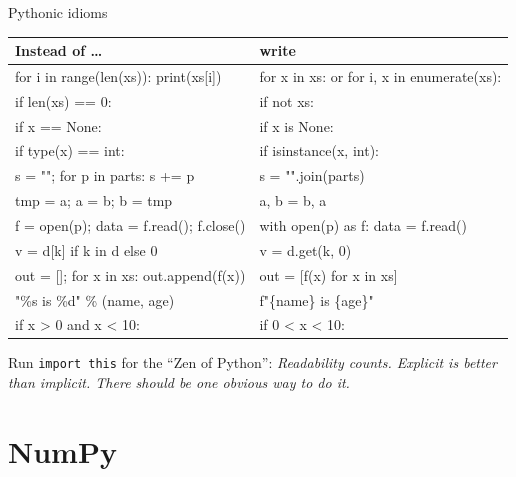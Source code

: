 \documentclass[aspectratio=169,9pt]{beamer}
\newcommand{\hint}[1]{{\small\color{ink2}#1}}  %
\newcommand{\gr}[1]{\textsf{\color{ink2}#1}}                %
\begin{document}
\begin{frame}{Pythonic idioms}
\small
\renewcommand{\arraystretch}{1.3}
\begin{tabular}{@{}>{\ttfamily\color{ink2}}l@{\hspace{2.2em}}>{\ttfamily}l@{}}
\toprule
\normalfont\textbf{Instead of \ldots} & \normalfont\textbf{write}\\
\midrule
for i in range(len(xs)): print(xs[i])      & for x in xs: \gr{or} for i, x in enumerate(xs): \\
if len(xs) == 0:                           & if not xs: \\
if x == None:                              & if x is None: \\
if type(x) == int:                         & if isinstance(x, int): \\
s = ""; for p in parts: s += p             & s = "".join(parts) \\
tmp = a; a = b; b = tmp                    & a, b = b, a \\
f = open(p); data = f.read(); f.close()    & with open(p) as f: data = f.read() \\
v = d[k] if k in d else 0                  & v = d.get(k, 0) \\
out = []; for x in xs: out.append(f(x))    & out = [f(x) for x in xs] \\
"\%s is \%d" \% (name, age)                & f"\{name\} is \{age\}" \\
if x > 0 and x < 10:                       & if 0 < x < 10: \\
\bottomrule
\end{tabular}

\vspace{8pt}
\hint{\faLightbulb[regular]\enspace Run \texttt{import this} for the
``Zen of Python'': \emph{Readability counts. Explicit is better than
implicit. There should be one obvious way to do it.}}
\end{frame}

\section{NumPy}
\end{document}
